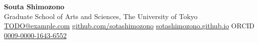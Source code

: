 %
\begin{center}
  {\huge\bfseries Souta Shimozono}\\[5pt]
  {\normalsize Graduate School of Arts and Sciences, The University of Tokyo}\\[6pt]
  \small
  \href{mailto:TODO@example.com}{TODO@example.com}
  \enspace\textbar\enspace
  \href{https://github.com/sotashimozono}{github.com/sotashimozono}
  \enspace\textbar\enspace
  \href{https://sotashimozono.github.io}{sotashimozono.github.io}
  \enspace\textbar\enspace
  ORCID \href{https://orcid.org/0009-0000-1643-6552}{0009-0000-1643-6552}
\end{center}
\vspace{4pt}

